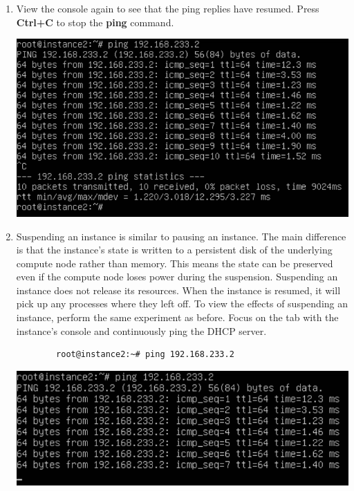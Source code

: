 \documentclass[letterpaper, 12pt]{article}
\begin{document}
\begin{enumerate}
    \item View the console again to see that the ping replies have resumed. Press \textbf{Ctrl+C} to stop the
    \textbf{ping} command.

    \begin{center}
        \includegraphics[width=\linewidth]{images/part3/step6.png}
    \end{center}

    \item Suspending an instance is similar to pausing an instance. The main difference is that the instance's state is
    written to a persistent disk of the underlying compute node rather than memory. This means the state can be
    preserved even if the compute node loses power during the suspension. Suspending an instance does not release its
    resources. When the instance is resumed, it will pick up any processes where they left off. To view the effects of
    suspending an instance, perform the same experiment as before. Focus on the tab with the instance's console and
    continuously ping the DHCP server.
    \begin{lstlisting}
        root@instance2:~# ping 192.168.233.2
    \end{lstlisting} 

    \begin{center}
        \includegraphics[width=\linewidth]{images/part3/step7.png}
    \end{center}


\end{enumerate}
\end{document}
